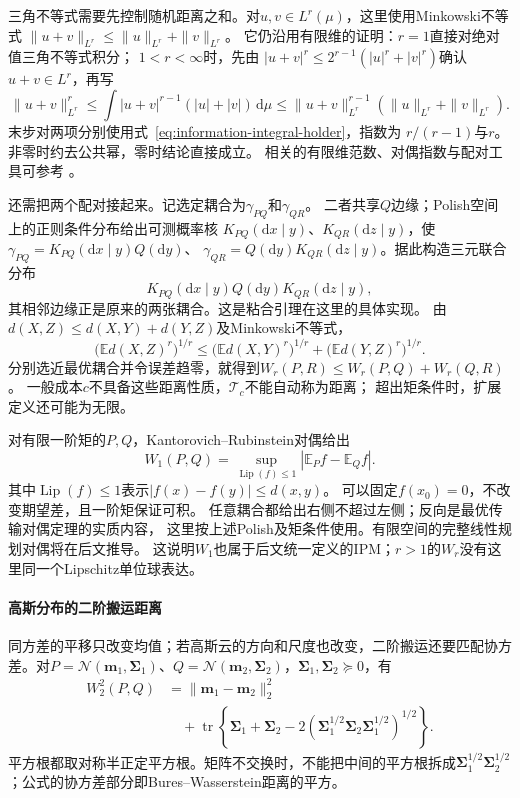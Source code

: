 三角不等式需要先控制随机距离之和。对\(u,v\in L^r(\mu)\)，这里使用Minkowski不等式
\(\|u+v\|_{L^r}\leq\|u\|_{L^r}+\|v\|_{L^r}\)。
它仍沿用有限维的证明：\(r=1\)直接对绝对值三角不等式积分；
\(1<r<\infty\)时，先由
\(|u+v|^r\leq2^{r-1}(|u|^r+|v|^r)\)确认\(u+v\in L^r\)，再写
\[
 \|u+v\|_{L^r}^r
 \leq\int|u+v|^{r-1}(|u|+|v|)\,\mathrm d\mu
 \leq\|u+v\|_{L^r}^{r-1}(\|u\|_{L^r}+\|v\|_{L^r}).
\]
末步对两项分别使用式~\eqref{eq:information-integral-holder}，指数为
\(r/(r-1)\)与\(r\)。非零时约去公共幂，零时结论直接成立。
相关的有限维范数、对偶指数与配对工具可参考
。

还需把两个配对接起来。记选定耦合为\(\gamma_{PQ}\)和\(\gamma_{QR}\)。
二者共享\(Q\)边缘；Polish空间上的正则条件分布给出可测概率核
\(K_{PQ}(\mathrm dx\mid y)\)、\(K_{QR}(\mathrm dz\mid y)\)，使
\(\gamma_{PQ}=K_{PQ}(\mathrm dx\mid y)Q(\mathrm dy)\)、
\(\gamma_{QR}=Q(\mathrm dy)K_{QR}(\mathrm dz\mid y)\)。据此构造三元联合分布
\[
  K_{PQ}(\mathrm dx\mid y)Q(\mathrm dy)K_{QR}(\mathrm dz\mid y),
\]
其相邻边缘正是原来的两张耦合。这是粘合引理在这里的具体实现。
由\(d(X,Z)\leq d(X,Y)+d(Y,Z)\)及Minkowski不等式，
\[
  \bigl(\mathbb E d(X,Z)^r\bigr)^{1/r}
  \leq\bigl(\mathbb E d(X,Y)^r\bigr)^{1/r}
       +\bigl(\mathbb E d(Y,Z)^r\bigr)^{1/r}.
\]
分别选近最优耦合并令误差趋零，就得到\(W_r(P,R)\leq W_r(P,Q)+W_r(Q,R)\)。
一般成本\(c\)不具备这些距离性质，\(\mathcal T_c\)不能自动称为距离；
超出矩条件时，扩展定义还可能为无限。

对有限一阶矩的\(P,Q\)，Kantorovich--Rubinstein对偶给出
\begin{equation}
  W_1(P,Q)=\sup_{\operatorname{Lip}(f)\leq1}
                         |\mathbb E_Pf-\mathbb E_Qf|.
  \label{eq:information-kr-duality}
\end{equation}
其中\(\operatorname{Lip}(f)\leq1\)表示\(|f(x)-f(y)|\leq d(x,y)\)。
可以固定\(f(x_0)=0\)，不改变期望差，且一阶矩保证可积。
任意耦合都给出右侧不超过左侧；反向是最优传输对偶定理的实质内容，
这里按上述Polish及矩条件使用。有限空间的完整线性规划对偶将在后文推导。
这说明\(W_1\)也属于后文统一定义的IPM；\(r>1\)的\(W_r\)没有这里同一个Lipschitz单位球表达。

\paragraph{高斯分布的二阶搬运距离}
同方差的平移只改变均值；若高斯云的方向和尺度也改变，二阶搬运还要匹配协方差。对\(P=\mathcal N(\bm m_1,\bm\Sigma_1)\)、\(Q=\mathcal N(\bm m_2,\bm\Sigma_2)\)，\(\bm\Sigma_1,\bm\Sigma_2\succeq0\)，有
\begin{equation}
\begin{aligned}
 W_2^2(P,Q)
 &=\|\bm m_1-\bm m_2\|_2^2\\
 &\quad+\operatorname{tr}\!\left\{
 \bm\Sigma_1+\bm\Sigma_2
 -2(\bm\Sigma_1^{1/2}\bm\Sigma_2\bm\Sigma_1^{1/2})^{1/2}
 \right\}.
 \label{eq:information-gaussian-wasserstein}
\end{aligned}
\end{equation}
平方根都取对称半正定平方根。矩阵不交换时，不能把中间的平方根拆成\(\bm\Sigma_1^{1/2}\bm\Sigma_2^{1/2}\)；公式的协方差部分即Bures--Wasserstein距离的平方。

